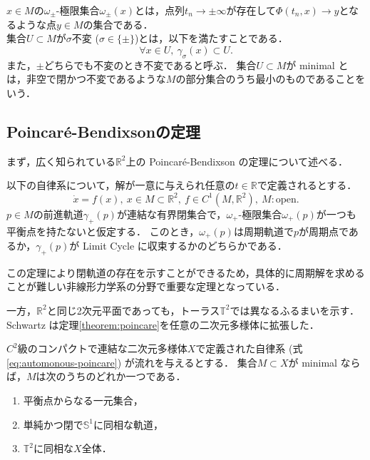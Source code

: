\documentclass[../main]{subfiles}
\begin{document}
$x\in M$の$\omega_\pm$-極限集合$\omega_\pm(x)$とは，点列$t_n\to \pm\infty$が存在して$\Phi(t_n,x)\to y$となるような点$y\in M$の集合である．\\

集合$U\subset M$が$\sigma$不変 ($\sigma\in\{\pm\}$)とは，以下を満たすことである．
\begin{equation}
    \forall x\in U,\ \gamma_\sigma (x)\subset U.
\end{equation}
また，$\pm$どちらでも不変のとき不変であると呼ぶ．
集合$U\subset M$が minimal とは，非空で閉かつ不変であるような$M$の部分集合のうち最小のものであることをいう．
\subsection{Poincar\'{e}-Bendixsonの定理}
まず，広く知られている$\mathbb{R}^2$上の Poincar\'{e}-Bendixson の定理について述べる．
\begin{theorem}
    以下の自律系について，解が一意に与えられ任意の$t\in\mathbb{R}$で定義されるとする．
    \begin{equation}
        \dot{x}=f(x),\ x\in M\subset \mathbb{R}^2,\ f\in C^1(M,\mathbb{R}^2),\ M:\mathrm{open}.         \label{eq:automonous-poincare}
    \end{equation}
    $p\in M$の前進軌道$\gamma_+(p)$が連結な有界閉集合で，$\omega_+$-極限集合$\omega_+(p)$が一つも平衡点を持たないと仮定する．
    このとき，$\omega_+(p)$は周期軌道で$p$が周期点であるか，$\gamma_+(p)$が Limit Cycle に収束するかのどちらかである．
    \label{theorem:poincare}
\end{theorem}
この定理により閉軌道の存在を示すことができるため，具体的に周期解を求めることが難しい非線形力学系の分野で重要な定理となっている．

一方，$\mathbb{R}^2$と同じ2次元平面であっても，トーラス$\mathbb{T}^2$では異なるふるまいを示す．
Schwartz は定理\ref{theorem:poincare}を任意の二次元多様体に拡張した\cite{Schwartz1963ErrataAG}．
\begin{theorem}
    \label{thm:poiben-gen}
    $C^2$級のコンパクトで連結な二次元多様体$X$で定義された自律系 (式\eqref{eq:automonous-poincare}) が流れを与えるとする．
    集合$M\subset X$が minimal ならば，$M$は次のうちのどれか一つである．
    \begin{enumerate}
        \item 平衡点からなる一元集合，
        \item 単純かつ閉で$\mathbb{S}^1$に同相な軌道，
        \item $\mathbb{T}^2$に同相な$X$全体．
    \end{enumerate}
\end{theorem}
\end{document}
